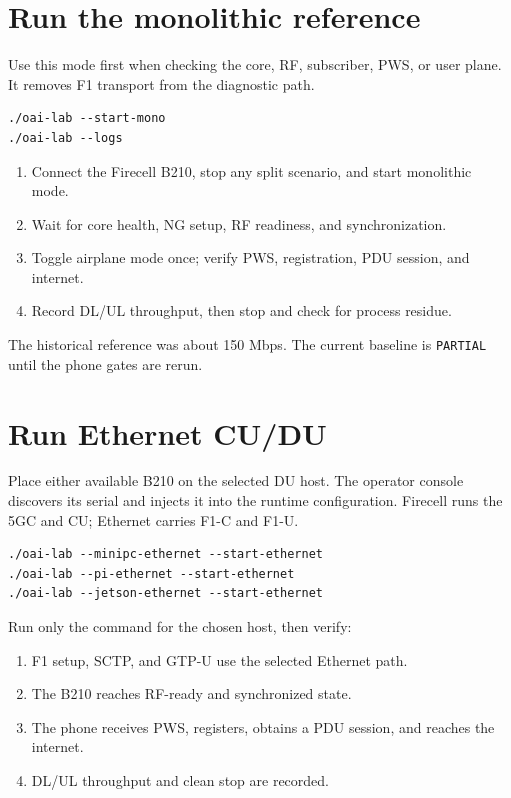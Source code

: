 \documentclass[11pt,a4paper]{article}
\begin{document}
\section{Run the monolithic reference}

Use this mode first when checking the core, RF, subscriber, PWS, or user plane.
It removes F1 transport from the diagnostic path.

\begin{lstlisting}
./oai-lab --start-mono
./oai-lab --logs
\end{lstlisting}

\begin{enumerate}
  \item Connect the Firecell B210, stop any split scenario, and start monolithic mode.
  \item Wait for core health, NG setup, RF readiness, and synchronization.
  \item Toggle airplane mode once; verify PWS, registration, PDU session, and internet.
  \item Record DL/UL throughput, then stop and check for process residue.
\end{enumerate}

The historical reference was about 150 Mbps. The current baseline is
\texttt{PARTIAL} until the phone gates are rerun.

\section{Run Ethernet CU/DU}

Place either available B210 on the selected DU host. The operator console discovers its
serial and injects it into the runtime configuration. Firecell runs the 5GC
and CU; Ethernet carries F1-C and F1-U.

\begin{lstlisting}
./oai-lab --minipc-ethernet --start-ethernet
./oai-lab --pi-ethernet --start-ethernet
./oai-lab --jetson-ethernet --start-ethernet
\end{lstlisting}

Run only the command for the chosen host, then verify:

\begin{enumerate}
  \item F1 setup, SCTP, and GTP-U use the selected Ethernet path.
  \item The B210 reaches RF-ready and synchronized state.
  \item The phone receives PWS, registers, obtains a PDU session, and reaches the internet.
  \item DL/UL throughput and clean stop are recorded.
\end{enumerate}
\end{document}
